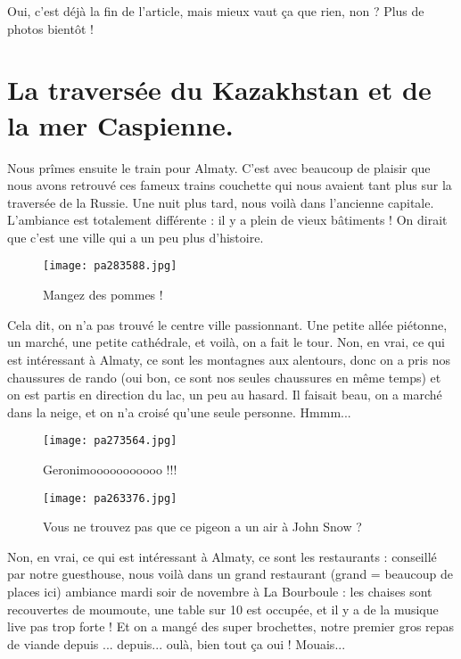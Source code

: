 \documentclass{book}
\begin{document}
Oui, c'est déjà la fin de l'article, mais mieux vaut ça que rien, non ? Plus de photos bientôt !

\chapter{La traversée du Kazakhstan et de la mer Caspienne.}
Nous prîmes ensuite le train pour Almaty. C'est avec beaucoup de plaisir que nous avons retrouvé ces fameux trains couchette qui nous avaient tant plus sur la traversée de la Russie. Une nuit plus tard, nous voilà dans l'ancienne capitale. L'ambiance est totalement différente : il y a plein de vieux bâtiments ! On dirait que c'est une ville qui a un peu plus d'histoire.


\begin{figure}[h]
\centering
\texttt{[image: pa283588.jpg]}
\caption*{Mangez des pommes !}
\end{figure}

Cela dit, on n'a pas trouvé le centre ville passionnant. Une petite allée piétonne, un marché, une petite cathédrale, et voilà, on a fait le tour. Non, en vrai, ce qui est intéressant à Almaty, ce sont les montagnes aux alentours, donc on a pris nos chaussures de rando (oui bon, ce sont nos seules chaussures en même temps) et on est partis en direction du lac, un peu au hasard. Il faisait beau, on a marché dans la neige, et on n'a croisé qu'une seule personne. Hmmm...


\begin{figure}[h]
\centering
\texttt{[image: pa273564.jpg]}
\caption*{Geronimooooooooooo !!!}
\end{figure}


\begin{figure}[h]
\centering
\texttt{[image: pa263376.jpg]}
\caption*{Vous ne trouvez pas que ce pigeon a un air à John Snow ?}
\end{figure}

Non, en vrai, ce qui est intéressant à Almaty, ce sont les restaurants : conseillé par notre guesthouse, nous voilà dans un grand restaurant (grand = beaucoup de places ici) ambiance mardi soir de novembre à La Bourboule : les chaises sont recouvertes de moumoute, une table sur 10 est occupée, et il y a de la musique live pas trop forte ! Et on a mangé des super brochettes, notre premier gros repas de viande depuis ... depuis... oulà, bien tout ça oui ! Mouais...
\end{document}
